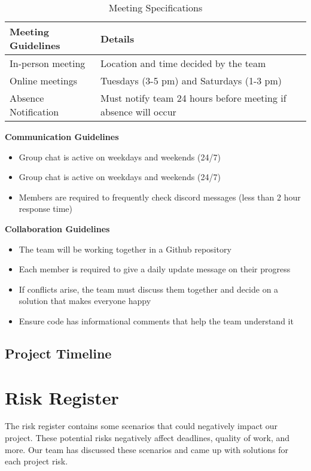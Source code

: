 \documentclass{article} %
\begin{document}
\begin{table}[H]
\caption{Meeting Specifications}
\begin{center}
\begin{tabular}{|l|l|}
\hline
\textbf{Meeting Guidelines} & \textbf{Details} \\ \hline
In-person meeting           & Location and time decided by the team \\ \hline
Online meetings             & Tuesdays (3-5 pm) and Saturdays (1-3 pm) \\ \hline
Absence Notification        & Must notify team 24 hours before meeting if absence will occur \\ \hline
\end{tabular}
\end{center}
\end{table}

\textbf{Communication Guidelines}
\begin{itemize}
  \item Group chat is active on weekdays and weekends (24/7)
  \item Group chat is active on weekdays and weekends (24/7)
  \item Members are required to frequently check discord messages (less than 2 hour response time)
\end{itemize}

\textbf{Collaboration Guidelines}
\begin{itemize}
  \item The team will be working together in a Github repository
  \item Each member is required to give a daily update message on their progress
  \item If conflicts arise, the team must discuss them together and decide on a solution that makes everyone happy
  \item Ensure code has informational comments that help the team understand it
\end{itemize}

\subsection{Project Timeline}



\section{Risk Register}
The risk register contains some scenarios that could negatively impact our project. 
These potential risks negatively affect deadlines, quality of work, and more. Our team has 
discussed these scenarios and came up with solutions for each project risk. 
\end{document}
